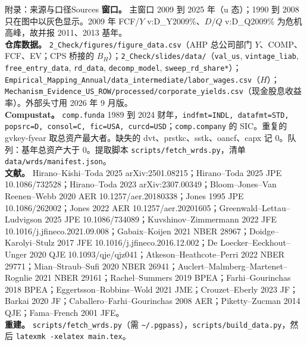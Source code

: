 \documentclass[aspectratio=169,10pt]{beamer}
\newcommand{\val}[1]{\csname v:#1\endcsname}
\begin{document}
\begin{frame}{附录：来源与口径}{Sources}
{\scriptsize
\textbf{窗口。} 主窗口 2009 到 2025 年（u 态）；1990 到 2008 只在图中以灰色显示。2009 年 FCF/$Y$ \val{D_Y2009}\%、$D/Q$ \val{D_Q2009}\% 为危机高峰，故并报 2011、2013 基年。\\[0.15cm]
\textbf{仓库数据。} \texttt{2\_Check/figures/figure\_data.csv}（AHP 总公司部门 $Y$、COMP、FCF、EV；CPS 桥接的 $B_H$）；\texttt{2\_Check/slides/data/}（\texttt{val\_us}, \texttt{vintage\_liab}, \texttt{free\_entry\_data}, \texttt{rd\_data}, \texttt{decomp\_model}, \texttt{sweep\_rd\_share*}）；\texttt{Empirical\_Mapping\_Annual/data\_intermediate/labor\_wages.csv}（$H$）；\texttt{Mechanism\_Evidence\_US\_ROW/processed/corporate\_yields.csv}（现金股息收益率）。外部头寸用 2026 年 9 月版。\\[0.15cm]
\textbf{Compustat。} \texttt{comp.funda} 1989 到 2024 财年，\texttt{indfmt=INDL, datafmt=STD, popsrc=D, consol=C, fic=USA, curcd=USD}；\texttt{comp.company} 的 SIC。重复的 gvkey-fyear 取总资产最大者。缺失的 dvt、prstkc、sstk、oancf、capx 记 0。队列：基年总资产大于 0。提取脚本 \texttt{scripts/fetch\_wrds.py}，清单 \texttt{data/wrds/manifest.json}。\\[0.15cm]
\textbf{文献。} Hirano–Kishi–Toda 2025 arXiv:2501.08215；Hirano–Toda 2025 JPE 10.1086/732528；Hirano–Toda 2023 arXiv:2307.00349；Bloom–Jones–Van Reenen–Webb 2020 AER 10.1257/aer.20180338；Jones 1995 JPE 10.1086/262002；Jones 2022 AER 10.1257/aer.20201605；Greenwald–Lettau–Ludvigson 2025 JPE 10.1086/734089；Kuvshinov–Zimmermann 2022 JFE 10.1016/j.jfineco.2021.09.008；Gabaix–Koijen 2021 NBER 28967；Doidge–Karolyi–Stulz 2017 JFE 10.1016/j.jfineco.2016.12.002；De Loecker–Eeckhout–Unger 2020 QJE 10.1093/qje/qjz041；Atkeson–Heathcote–Perri 2022 NBER 29771；Mian–Straub–Sufi 2020 NBER 26941；Auclert–Malmberg–Martenet–Rognlie 2021 NBER 29161；Rachel–Summers 2019 BPEA；Farhi–Gourinchas 2018 BPEA；Eggertsson–Robbins–Wold 2021 JME；Crouzet–Eberly 2023 JF；Barkai 2020 JF；Caballero–Farhi–Gourinchas 2008 AER；Piketty–Zucman 2014 QJE；Fama–French 2001 JFE。\\[0.15cm]
\textbf{重建。} \texttt{scripts/fetch\_wrds.py}（需 \texttt{\textasciitilde/.pgpass}），\texttt{scripts/build\_data.py}，然后 \texttt{latexmk -xelatex main.tex}。}
\end{frame}
\end{document}
